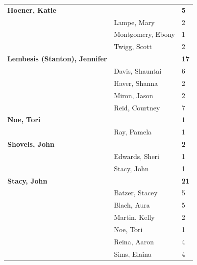 \documentclass{article}\usepackage[]{graphicx}\usepackage[]{color}
\begin{document}
\begin{longtable} { >{\raggedright}p{}|p{}p{}}
  \textbf{Hoener, Katie} &  & \hspace{2cm}\textbf{\textbf{5}} \\ 
   & Lampe, Mary & 2 \\ 
   \rowcolor[gray]{0.90} & Montgomery, Ebony & 1 \\ 
   \rowcolor[gray]{0.90} & Twigg, Scott & 2 \\ 
   \rowcolor[gray]{0.90}\textbf{Lembesis (Stanton), Jennifer} &  & \hspace{2cm}\textbf{\textbf{17}} \\ 
   & Davis, Shauntai & 6 \\ 
   & Haver, Shanna & 2 \\ 
   & Miron, Jason & 2 \\ 
   \rowcolor[gray]{0.90} & Reid, Courtney & 7 \\ 
   \rowcolor[gray]{0.90}\textbf{Noe, Tori} &  & \hspace{2cm}\textbf{\textbf{1}} \\ 
   \rowcolor[gray]{0.90} & Ray, Pamela & 1 \\ 
  \textbf{Shovels, John} &  & \hspace{2cm}\textbf{\textbf{2}} \\ 
   & Edwards, Sheri & 1 \\ 
   & Stacy, John & 1 \\ 
   \rowcolor[gray]{0.90}\textbf{Stacy, John} &  & \hspace{2cm}\textbf{\textbf{21}} \\ 
   \rowcolor[gray]{0.90} & Batzer, Stacey & 5 \\ 
   \rowcolor[gray]{0.90} & Blach, Aura & 5 \\ 
   & Martin, Kelly & 2 \\ 
   & Noe, Tori & 1 \\ 
   & Reina, Aaron & 4 \\ 
   \rowcolor[gray]{0.90} & Sims, Elaina & 4 \\ 
   \end{longtable}
\end{document}
